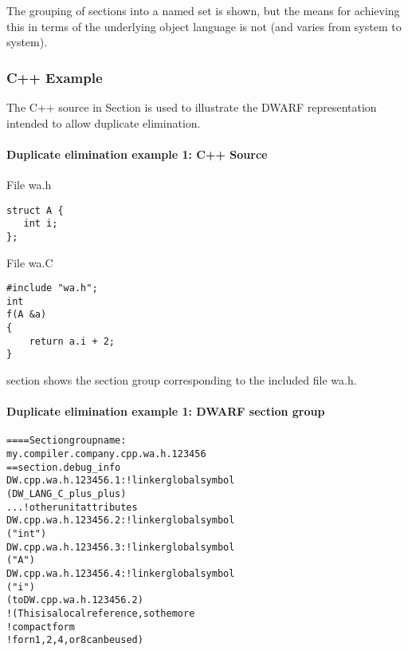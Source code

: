 The grouping of sections into a named set is shown, but the means for achieving this in terms of
the underlying object language is not (and varies from system to system).

\subsubsection{C++ Example}

The C++ source in 
Section 
is used to illustrate the DWARF
representation intended to allow duplicate elimination.

\paragraph{Duplicate elimination example 1: C++ Source} 
\label{app:duplicateeliminationexample1csource}

File wa.h

\begin{lstlisting}
struct A {
   int i;
};
\end{lstlisting}

File wa.C

\begin{lstlisting}
#include "wa.h";
int
f(A &a)
{
    return a.i + 2;
}
\end{lstlisting}


section 
shows the section group corresponding to the included file 
wa.h.


\paragraph{Duplicate elimination example 1: DWARF section group} 

\label{app:duplicateeliminationexample1dwarfsectiongroup}
\begin{alltt}
==== Section group name:
    my.compiler.company.cpp.wa.h.123456
== section .debug\_info
DW.cpp.wa.h.123456.1: ! linker global symbol
        (DW\-\_LANG\-\_C\-\_plus\-\_plus)
        ...  ! other unit attributes
DW.cpp.wa.h.123456.2: ! linker global symbol
        ("int")
DW.cpp.wa.h.123456.3: ! linker global symbol
        ("A")
DW.cpp.wa.h.123456.4: ! linker global symbol
        ("i")
        ( to DW.cpp.wa.h.123456.2)
            ! (This is a local reference, so the more
            ! compact form  
            ! for n 1,2,4, or 8 can be used)
\end{alltt}


